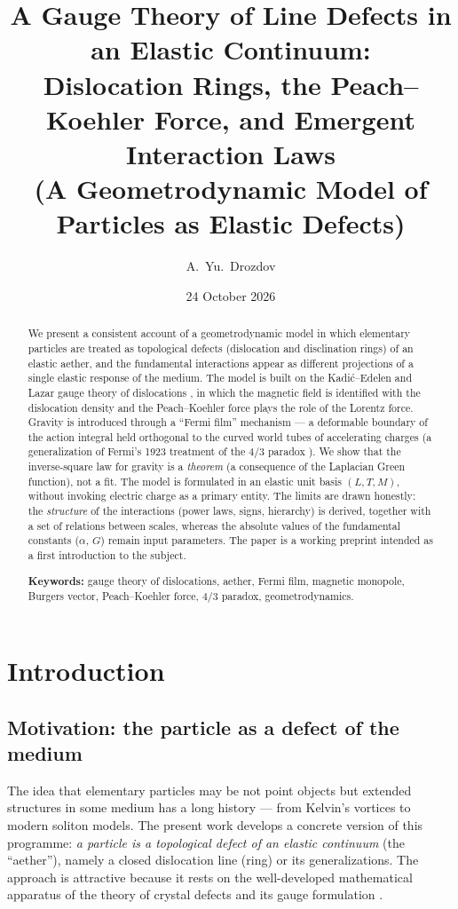 \documentclass[12pt,a4paper]{article}
\title{\textbf{A Gauge Theory of Line Defects in an Elastic Continuum:\\
Dislocation Rings, the Peach--Koehler Force, and Emergent Interaction Laws\\
{\large (A Geometrodynamic Model of Particles as Elastic Defects)}}}
\author{A.~Yu.~Drozdov}
\date{24 October 2026}
\begin{document}
\maketitle

\begin{abstract}
\noindent
We present a consistent account of a geometrodynamic model in which elementary
particles are treated as topological defects (dislocation and disclination
rings) of an elastic aether, and the fundamental interactions appear as
different projections of a single elastic response of the medium. The model is
built on the Kadi\'c--Edelen and Lazar gauge theory of dislocations
\cite{lazar2010,kadic1983}, in which the magnetic field is identified with the
dislocation density and the Peach--Koehler force plays the role of the Lorentz
force. Gravity is introduced through a ``Fermi film'' mechanism --- a
deformable boundary of the action integral held orthogonal to the curved world
tubes of accelerating charges (a generalization of Fermi's 1923 treatment of
the $4/3$ paradox \cite{fermi1923}). We show that the inverse-square law for
gravity is a \emph{theorem} (a consequence of the Laplacian Green function),
not a fit. The model is formulated in an elastic unit basis $(L,T,M)$, without
invoking electric charge as a primary entity. The limits are drawn honestly:
the \emph{structure} of the interactions (power laws, signs, hierarchy) is
derived, together with a set of relations between scales, whereas the absolute
values of the fundamental constants ($\alpha$, $G$) remain input parameters.
The paper is a working preprint intended as a first introduction to the
subject.

\medskip
\noindent\textbf{Keywords:} gauge theory of dislocations, aether, Fermi film,
magnetic monopole, Burgers vector, Peach--Koehler force, $4/3$ paradox,
geometrodynamics.
\end{abstract}

\tableofcontents
\newpage

\section{Introduction}

\subsection{Motivation: the particle as a defect of the medium}
The idea that elementary particles may be not point objects but extended
structures in some medium has a long history --- from Kelvin's vortices to
modern soliton models. The present work develops a concrete version of this
programme: \emph{a particle is a topological defect of an elastic continuum}
(the ``aether''), namely a closed dislocation line (ring) or its
generalizations. The approach is attractive because it rests on the
well-developed mathematical apparatus of the theory of crystal defects
\cite{hirth1982,kadic1983} and its gauge formulation \cite{lazar2010}.
\end{document}
